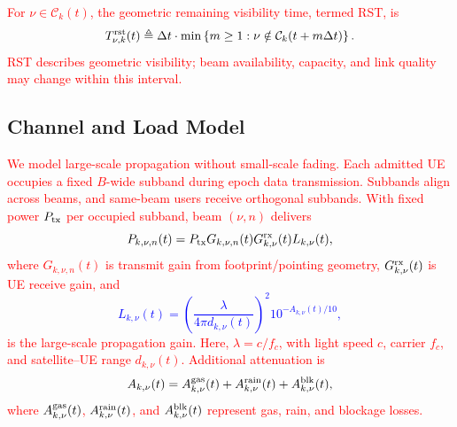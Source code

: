 \documentclass[10pt,letterpaper,journal]{IEEEtran}
\newcommand{\revnew}[1]{\textcolor{red}{#1}}
\begin{document}
\revnew{For $\nu\in\mathcal C_k(t)$, the geometric remaining visibility time, termed RST, is}
\begin{equation}
T^{\rm rst}_{\nu,k}(t)
\triangleq
\Delta t\cdot
\min
\left\{
m\ge 1:
\nu\notin \mathcal C_k(t+m\Delta t)
\right\}.
\label{eq:geometry_rst}
\end{equation}
\revnew{RST describes geometric visibility; beam availability, capacity, and link quality may change within this interval.}


\vspace{-2mm}
\subsection{Channel and Load Model}
\label{subsec:link}

\textcolor{blue}{
\revnew{We model large-scale propagation without small-scale fading. Each admitted UE occupies a fixed $B$-wide subband during epoch data transmission. Subbands align across beams, and same-beam users receive orthogonal subbands. With fixed power $P_{\rm tx}$ per occupied subband, beam $(\nu,n)$ delivers}
\begin{equation}
P_{k,\nu,n}(t)
=P_{\rm tx}G_{k,\nu,n}(t)G^{\rm rx}_{k,\nu}(t)
L_{k,\nu}(t),
\label{eq:received_power}
\end{equation}
\revnew{where $G_{k,\nu,n}(t)$ is transmit gain from footprint/pointing geometry, $G^{\rm rx}_{k,\nu}(t)$ is UE receive gain, and}
\begin{equation}
L_{k,\nu}(t)
=
\left(\frac{\lambda}{4\pi d_{k,\nu}(t)}\right)^2
10^{-A_{k,\nu}(t)/10},
\label{eq:large_scale_gain}
\end{equation}
\revnew{is the large-scale propagation gain. Here, $\lambda=c/f_c$, with light speed $c$, carrier $f_c$, and satellite--UE range $d_{k,\nu}(t)$. Additional attenuation is}
\begin{equation}
A_{k,\nu}(t)
=A^{\rm gas}_{k,\nu}(t)+A^{\rm rain}_{k,\nu}(t)
+A^{\rm blk}_{k,\nu}(t),
\label{eq:additional_attenuation}
\end{equation}
\revnew{where $A^{\rm gas}_{k,\nu}(t)$, $A^{\rm rain}_{k,\nu}(t)$, and $A^{\rm blk}_{k,\nu}(t)$ represent gas, rain, and blockage losses.} 
}
\end{document}
